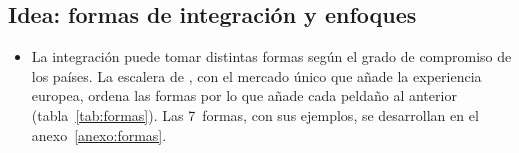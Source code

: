 \documentclass[11pt]{article}
\begin{document}
\subsection{Idea: formas de integración y enfoques}\label{sec:idea-formas}

\begin{itemize}
\item La integración puede tomar distintas formas según el grado de compromiso de los países. La escalera de \textcite{Balassa1961Theory}, con el mercado único que añade la experiencia europea, ordena las formas por lo que añade cada peldaño al anterior (tabla~\ref{tab:formas}). Las 7~formas, con sus ejemplos, se desarrollan en el anexo~\ref{anexo:formas}.
\end{itemize}
\end{document}
